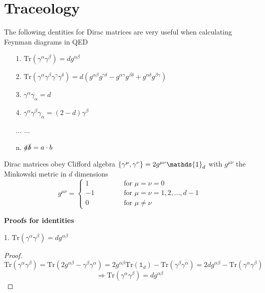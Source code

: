 \section{Traceology}
\label{app:Traceology}
The following dentities for Dirac matrices are very useful when calculating Feynman diagrams in QED
\begin{itemize}
\item[1.] $\mathrm{Tr} \left( \gamma^{\alpha} \gamma^{\beta} \right) = dg^{\alpha\beta}$
\item[2.] $\mathrm{Tr} \left( \gamma^{\alpha}\gamma^{\beta}\gamma^{\gamma}\gamma^{\delta} \right) = d \left( g^{\alpha\beta}g^{\gamma\delta} - g^{\alpha\gamma}g^{\beta\delta} + g^{\alpha\delta}g^{\beta\gamma} \right)$
\item[3.] $\gamma^{\alpha}\gamma_{\alpha} = d$
\item[4.] $\gamma^{\alpha}\gamma^{\beta}\gamma_{\alpha} = \left( 2-d \right) \gamma^{\beta}$
\item[$\ldots$] $\ldots$
\item[n.]$\slashed{a}\slashed{b} = a \cdot b$
\end{itemize}


Dirac matrices obey Clifford algebra $\lbr \gamma^{\mu}, \gamma^{\nu} \rbr = 2 g^{\mu\nu} \mathds{1}_d$ with $g^{\mu\nu}$ the Minkowski metric in $d$ dimensions
\begin{equation*}
 g^{\mu\nu} = 
\begin{cases}
1 \quad\qquad\qquad \text{for } \mu = \nu = 0 \\
-1 \ \qquad\qquad \text{for } \mu = \nu = 1,2,\ldots,d-1 \\
0 \quad\qquad\qquad \text{for } \mu \neq \nu
\end{cases}
\end{equation*}



{\bf Proofs for identities}

1. $\mathrm{Tr} \left( \gamma^{\alpha} \gamma^{\beta} \right) = dg^{\alpha\beta}$
\begin{proof}
\begin{equation*}
\mathrm{Tr} \left( \gamma^{\alpha} \gamma^{\beta} \right) = \mathrm{Tr} \left( 2 g^{\alpha\beta} - \gamma^{\beta}\gamma^{\alpha} \right) = 2g^{\alpha\beta} \mathrm{Tr} \left( \mathds{1}_d \right) - \mathrm{Tr} \left( \gamma^{\beta} \gamma^{\alpha} \right) = 2dg^{\alpha\beta} - \mathrm{Tr} \left( \gamma^{\alpha} \gamma^{\beta} \right)
\end{equation*}
\begin{equation*}
\Rightarrow \mathrm{Tr} \left( \gamma^{\alpha} \gamma^{\beta} \right) = dg^{\alpha\beta}
\end{equation*}
\end{proof}

